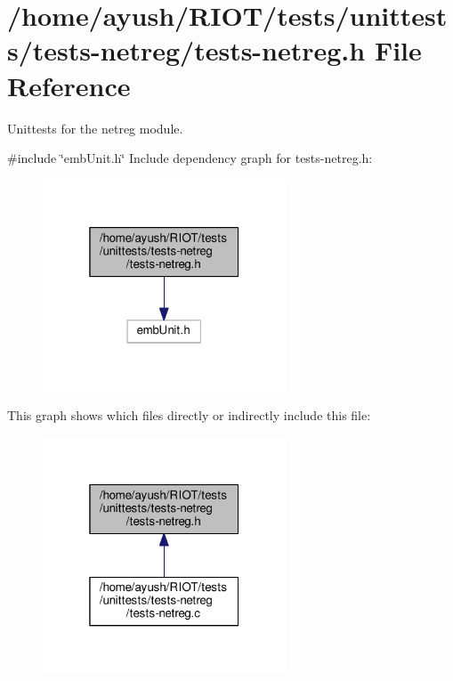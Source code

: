 \hypertarget{tests-netreg_8h}{}\section{/home/ayush/\+R\+I\+O\+T/tests/unittests/tests-\/netreg/tests-\/netreg.h File Reference}
\label{tests-netreg_8h}


Unittests for the {\ttfamily netreg} module.  


{\ttfamily \#include \char`\"{}emb\+Unit.\+h\char`\"{}}\newline
Include dependency graph for tests-\/netreg.h\+:
\nopagebreak
\begin{figure}[H]
\begin{center}
\leavevmode
\includegraphics[width=205pt]{tests-netreg_8h__incl}
\end{center}
\end{figure}
This graph shows which files directly or indirectly include this file\+:
\nopagebreak
\begin{figure}[H]
\begin{center}
\leavevmode
\includegraphics[width=205pt]{tests-netreg_8h__dep__incl}
\end{center}
\end{figure}
